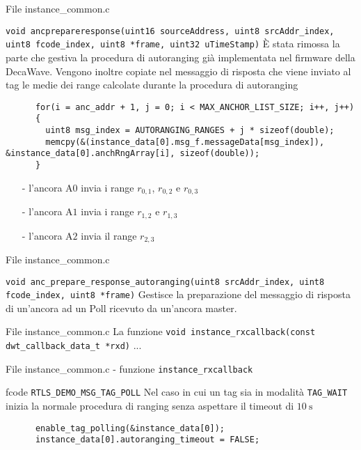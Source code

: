 \begin{frame}[fragile,shrink=20]{File instance\_common.c}
  \begin{block}{\lstinline!void ancprepareresponse(uint16 sourceAddress, uint8 srcAddr_index, uint8 fcode_index, uint8 *frame, uint32 uTimeStamp)!}
    È stata rimossa la parte che gestiva la procedura di autoranging già implementata nel firmware della DecaWave. Vengono inoltre copiate nel messaggio
    di risposta che viene inviato al tag le medie dei range calcolate durante la procedura di autoranging
    \begin{lstlisting}
      for(i = anc_addr + 1, j = 0; i < MAX_ANCHOR_LIST_SIZE; i++, j++)
      {
        uint8 msg_index = AUTORANGING_RANGES + j * sizeof(double);
        memcpy(&(instance_data[0].msg_f.messageData[msg_index]), &instance_data[0].anchRngArray[i], sizeof(double));
      }
    \end{lstlisting}
    \begin{itemize}
    \item[-] l'ancora A$0$ invia i range $r_{0,1}$, $r_{0,2}$ e $r_{0,3}$
    \item[-] l'ancora A$1$ invia i range $r_{1,2}$ e $r_{1,3}$
    \item[-] l'ancora A$2$ invia il range $r_{2,3}$
    \end{itemize}
  \end{block}
\end{frame}

\begin{frame}{File instance\_common.c}
  \begin{block}{\lstinline!void anc_prepare_response_autoranging(uint8 srcAddr_index, uint8 fcode_index, uint8 *frame)!}
    Gestisce la preparazione del messaggio di risposta di un'ancora ad un Poll ricevuto da un'ancora master.
  \end{block}
\end{frame}

\begin{frame}{File instance\_common.c}
  La funzione \lstinline!void instance_rxcallback(const dwt_callback_data_t *rxd)! ...
\end{frame}

\begin{frame}[fragile]{File instance\_common.c - funzione \lstinline!instance_rxcallback!}
  \begin{block}{fcode \lstinline!RTLS_DEMO_MSG_TAG_POLL!}
    Nel caso in cui un tag sia in modalità \lstinline!TAG_WAIT! inizia la normale procedura di ranging senza aspettare il timeout di $\SI{10}{\second}$
    \begin{lstlisting}
      enable_tag_polling(&instance_data[0]);
      instance_data[0].autoranging_timeout = FALSE;
    \end{lstlisting}
  \end{block}
\end{frame}

